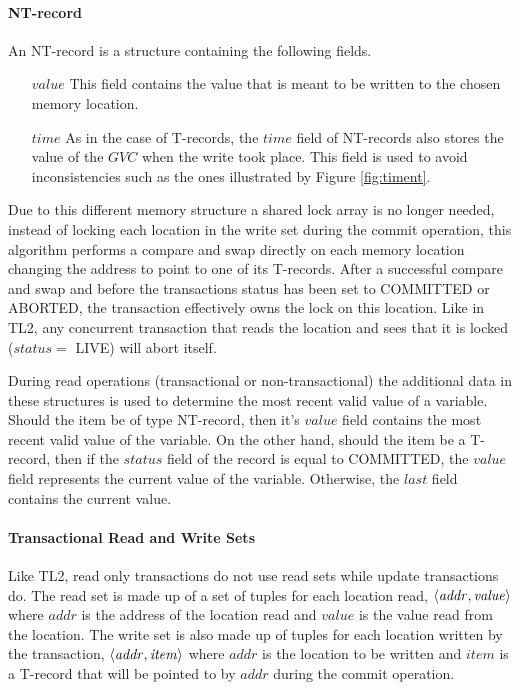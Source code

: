 \documentclass[11pt,letterpaper]{article}
\begin{document}
\paragraph{NT-record}
An NT-record is a structure containing the following fields.
\begin{itemize}
\vspace{-0.1cm}
\item[$\mathit{value}$]
This field contains the value that is meant to be written to the chosen 
memory location.
\vspace{-0.2cm}
\item[$\mathit{time}$]
As in the case of T-records, the $\mathit{time}$ field of NT-records 
also stores the value 
of the $\mathit{GVC}$ when the write took place. This field is 
used to avoid inconsistencies such as the ones illustrated by Figure 
\ref{fig:timent}. 
\end{itemize}

Due to this different memory structure a shared lock array is no longer needed,
instead of locking each location in the write set during the commit operation, this algorithm
performs a compare and swap directly on each memory location changing the address to point to one of its T-records.
After a successful compare and swap
 and before the transactions status has been set to COMMITTED or ABORTED, the transaction effectively
owns the lock on this location.
Like in TL2, any concurrent transaction that reads the location and sees that it is locked ($\mathit{status} = $ LIVE) will
abort itself.

During read operations (transactional or non-transactional) the additional data in these structures is used 
to determine the most  recent valid value  of a variable.
Should the item be of type NT-record,
then it's $\mathit{value}$ field contains the most  
recent valid value  of the variable. On the other hand,  should the item
 be a  T-record, then if the $\mathit{status}$ field of
the record is equal to COMMITTED,  
the $\mathit{value}$ field represents the current value of the variable. Otherwise, the
$\mathit{last}$ field contains the current value.

\paragraph{Transactional Read and Write Sets}
Like TL2, read only transactions do not use read sets while update transactions do.
The read set is made up of a set of tuples for each location read, $\left \langle \mathit{addr, value} \right \rangle $
where $\mathit{addr}$ is the address of the location read and $\mathit{value}$ is the value
read from the location.
The write set is also made up of tuples for each location written by the transaction,
$\left \langle \mathit{addr, item} \right \rangle $ where $\mathit{addr}$ is the location to be written
and $\mathit{item}$ is a T-record that will be pointed to
by $\mathit{addr}$ during the commit operation.
\end{document}
